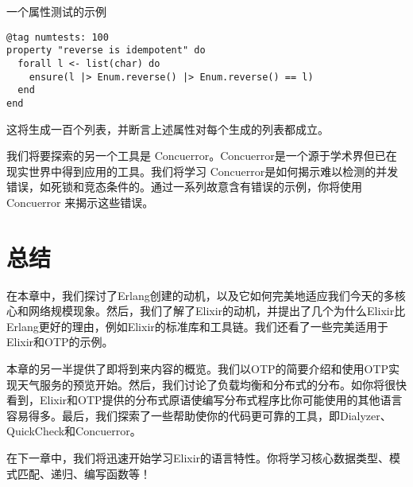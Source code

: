 \begin{code}{一个属性测试的示例}
\begin{verbatim}
@tag numtests: 100
property "reverse is idempotent" do
  forall l <- list(char) do
    ensure(l |> Enum.reverse() |> Enum.reverse() == l)
  end
end
\end{verbatim}
\label{lst:property_test_example}
\end{code}

这将生成一百个列表，并断言上述属性对每个生成的列表都成立。

我们将要探索的另一个工具是 Concuerror。Concuerror是一个源于学术界但已在现实世界中得到应用的工具。我们将学习 Concuerror是如何揭示难以检测的并发错误，如死锁和竞态条件的。通过一系列故意含有错误的示例，你将使用Concuerror 来揭示这些错误。

\section{总结}

在本章中，我们探讨了Erlang创建的动机，以及它如何完美地适应我们今天的多核心和网络规模现象。然后，我们了解了Elixir的动机，并提出了几个为什么Elixir比Erlang更好的理由，例如Elixir的标准库和工具链。我们还看了一些完美适用于Elixir和OTP的示例。

本章的另一半提供了即将到来内容的概览。我们以OTP的简要介绍和使用OTP实现天气服务的预览开始。然后，我们讨论了负载均衡和分布式的分布。如你将很快看到，Elixir和OTP提供的分布式原语使编写分布式程序比你可能使用的其他语言容易得多。最后，我们探索了一些帮助使你的代码更可靠的工具，即Dialyzer、QuickCheck和Concuerror。

在下一章中，我们将迅速开始学习Elixir的语言特性。你将学习核心数据类型、模式匹配、递归、编写函数等！
